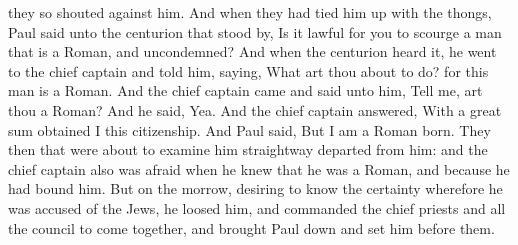 they so shouted against him. And when they had tied him up with the thongs, Paul said unto the centurion that stood by, Is it lawful for you to scourge a man that is a Roman, and uncondemned? And when the centurion heard it, he went to the chief captain and told him, saying, What art thou about to do? for this man is a Roman. And the chief captain came and said unto him, Tell me, art thou a Roman? And he said, Yea. And the chief captain answered, With a great sum obtained I this citizenship. And Paul said, But I am a Roman born. They then that were about to examine him straightway departed from him: and the chief captain also was afraid when he knew that he was a Roman, and because he had bound him.  But on the morrow, desiring to know the certainty wherefore he was accused of the Jews, he loosed him, and commanded the chief priests and all the council to come together, and brought Paul down and set him before them. 

